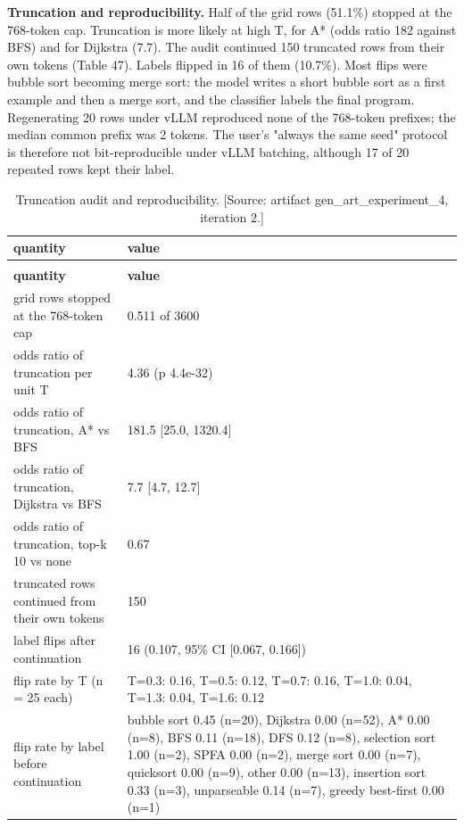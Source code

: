 \documentclass[11pt,letterpaper]{article}
\begin{document}
\endgroup
\textbf{Truncation and reproducibility.} Half of the grid rows (51.1\%) stopped at the 768-token cap. Truncation is more likely at high T, for A* (odds ratio 182 against BFS) and for Dijkstra (7.7). The audit continued 150 truncated rows from their own tokens (Table 47). Labels flipped in 16 of them (10.7\%). Most flips were bubble sort becoming merge sort: the model writes a short bubble sort as a first example and then a merge sort, and the classifier labels the final program. Regenerating 20 rows under vLLM reproduced none of the 768-token prefixes; the median common prefix was 2 tokens. The user's "always the same seed" protocol is therefore not bit-reproducible under vLLM batching, although 17 of 20 repeated rows kept their label.

\begingroup\small
\setlength{\tabcolsep}{4.0pt}
\begin{longtable}{@{}>{\raggedright\arraybackslash\hspace{0pt}}p{205.41pt}>{\raggedright\arraybackslash\hspace{0pt}}p{248.34pt}@{}}
\caption{Truncation audit and reproducibility. [Source: artifact gen\_art\_experiment\_4, iteration 2.]}\label{tab:47}\\
\toprule
\textbf{quantity} & \textbf{value} \\
\midrule
\endfirsthead
\multicolumn{2}{@{}l}{\emph{(continued)}}\\
\toprule
\textbf{quantity} & \textbf{value} \\
\midrule
\endhead
\bottomrule
\endlastfoot
grid rows stopped at the 768-token cap & 0.511 of 3600 \\
odds ratio of truncation per unit T & 4.36 (p 4.4e-32) \\
odds ratio of truncation, A* vs BFS & 181.5 [25.0, 1320.4] \\
odds ratio of truncation, Dijkstra vs BFS & 7.7 [4.7, 12.7] \\
odds ratio of truncation, top-k 10 vs none & 0.67 \\
truncated rows continued from their own tokens & 150 \\
label flips after continuation & 16 (0.107, 95\% CI [0.067, 0.166]) \\
flip rate by T (n = 25 each) & T=0.3: 0.16, T=0.5: 0.12, T=0.7: 0.16, T=1.0: 0.04, T=1.3: 0.04, T=1.6: 0.12 \\
flip rate by label before continuation & bubble sort 0.45 (n=20), Dijkstra 0.00 (n=52), A* 0.00 (n=8), BFS 0.11 (n=18), DFS 0.12 (n=8), selection sort 1.00 (n=2), SPFA 0.00 (n=2), merge sort 0.00 (n=7), quicksort 0.00 (n=9), other 0.00 (n=13), insertion sort 0.33 (n=3), unparseable 0.14 (n=7), greedy best-first 0.00 (n=1) \\

\end{longtable}
\end{document}
